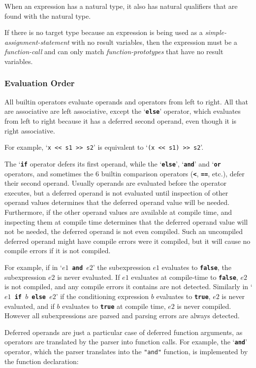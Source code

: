 \documentclass[12pt]{article}
\newcommand{\TT}[1]{{\tt \bfseries #1}}
\begin{document}
When an expression has a natural type, it also has natural qualifiers
that are found with the natural type.

If there is no target type because an expression is being used
as a {\em simple-assignment-statement} with no result variables, then
the expression must be a {\em function-call} and can only match
{\em function-prototypes} that have no result variables.

\subsubsection{Evaluation Order}
\label{EVALUATION-ORDER}

All builtin operators evaluate operands and operators from
left to right.  All that are associative are left associative,
except the `\TT{else}' operator, which evaluates from left
to right because it has a deferred second operand, even though
it is right associative.

For example, `{\tt x <{}< s1 >{}> s2}' is
equivalent to `{\tt (x <{}< s1) >{}> s2}'.

The `\TT{if} operator defers its first operand, while
the `\TT{else}', `\TT{and}' and `\TT{or} operators, and sometimes the
6 builtin comparison operators (\TT{<}, \TT{==}, etc.),
defer their second operand.  Usually operands are evaluated
before the operator executes, but a deferred operand is not
evaluated until inspection of other operand values determines
that the deferred operand value will be needed.  Furthermore,
if the other operand values are available at compile time,
and inspecting them at compile time determines that the deferred
operand value will not be needed, the deferred operand is not
even compiled.  Such an uncompiled deferred operand might have
compile errors were it compiled, but it will cause no compile
errors if it is not compiled.

For example, if in `\TT{$e1$~and~$e2$}' the subexpression $e1$
evaluates to \TT{false}, the subexpression $e2$ is never evaluated.
If $e1$ evaluates at compile-time to \TT{false},
$e2$ is not compiled, and any compile errors it contains
are not detected.  Similarly in `\TT{$e1$~if~$b$~else~$e2$}' if the
conditioning expression $b$ evaluates to \TT{true}, $e2$ is
never evaluated, and if $b$ evaluates to \TT{true} at compile
time, $e2$ is never compiled.  However all subexpressions are parsed and
parsing errors are always detected.

Deferred operands are just a particular case of deferred function arguments,
as operators are translated by the parser into function calls.
For example, the `\TT{and}' operator, which the parser translates
into the {\tt "and"} function, is implemented by the function
declaration:
\end{document}
